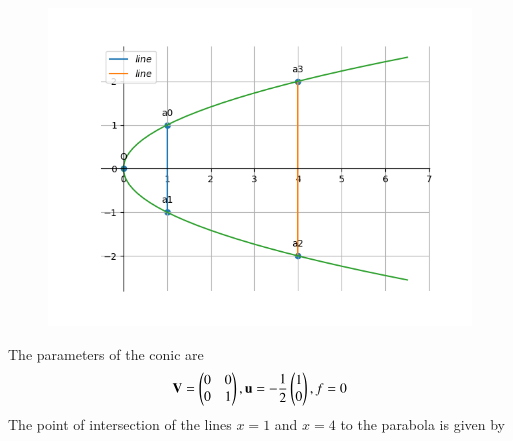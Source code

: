 	\begin{figure}[!h]
		\centering
 \includegraphics[width=\columnwidth]{chapters/12/8/1/1/figs/conics1.png}
		\caption{}
		\label{fig:12/8/1/1}
  	\end{figure}

The parameters of the conic are
\begin{align}
	\mathbf{V} = \begin{pmatrix}0 & 0\\0 & 1\end{pmatrix},
	\mathbf{u} = -\frac{1}{2}\begin{pmatrix} 1\\0\end{pmatrix},
	f = 0
\end{align}
\iffalse
The point of intersection of the lines $x=1$ and $x=4$ to the parabola is given by


